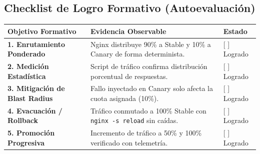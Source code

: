 \documentclass[10pt,letterpaper]{article}
\begin{document}
\subsection{Checklist de Logro Formativo (Autoevaluación)}
\small
\begin{tabularx}{\textwidth}{|L{4.2cm}|X|C{2.5cm}|}
\hline
{}
\textbf{Objetivo Formativo} & \textbf{Evidencia Observable} & \textbf{Estado} \\ \hline
\textbf{1. Enrutamiento Ponderado} & Nginx distribuye 90\% a Stable y 10\% a Canary de forma determinista. & [ ] Logrado \\ \hline
\textbf{2. Medición Estadística} & Script de tráfico confirma distribución porcentual de respuestas. & [ ] Logrado \\ \hline
\textbf{3. Mitigación de Blast Radius} & Fallo inyectado en Canary solo afecta la cuota asignada (10\%). & [ ] Logrado \\ \hline
\textbf{4. Evacuación / Rollback} & Tráfico conmutado a 100\% Stable con \texttt{nginx -s reload} sin caídas. & [ ] Logrado \\ \hline
\textbf{5. Promoción Progresiva} & Incremento de tráfico a 50\% y 100\% verificado con telemetría. & [ ] Logrado \\ \hline
\end{tabularx}
\end{document}
